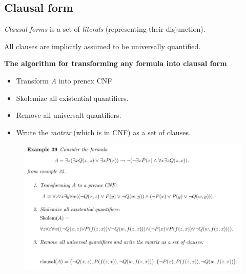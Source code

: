 \subsection{Clausal form}

\textit{Clausal forms} \cite[p. 62]{LecPartII} is a set of \textit{literals} (representing their disjunction).

All clauses are implicitly assumed to be universally quantified.

\textbf{The algorithm for transforming any formula into clausal form}

\begin{itemize}
\item Transform \textit{A} into prenex CNF
\item Skolemize all existential quantifiers.
\item Remove all universalt quantifiers.
\item Wrute the \textit{matrix} (which is in CNF) as a set of clauses.
\end{itemize}

\begin{figure}[H]
\includegraphics[scale=0.6]{./figures/clausalex.pdf}
\end{figure}

